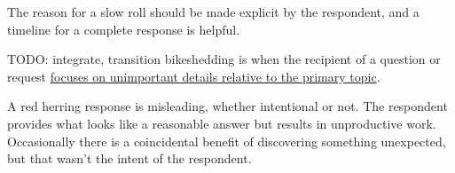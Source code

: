 The reason for a slow roll should be made explicit by the respondent, 
and a timeline for a complete response is helpful. 

TODO: integrate, transition
\gls{bikeshedding} is when the recipient of a question or request \href{https://en.wikipedia.org/wiki/Law_of_triviality}{focuses on unimportant details relative to the primary topic}. 

A \gls{red herring} response is misleading, whether intentional or not. The respondent provides what looks like a reasonable answer but results in unproductive work. Occasionally there is a coincidental benefit of discovering something unexpected, but that wasn't the intent of the respondent. 


